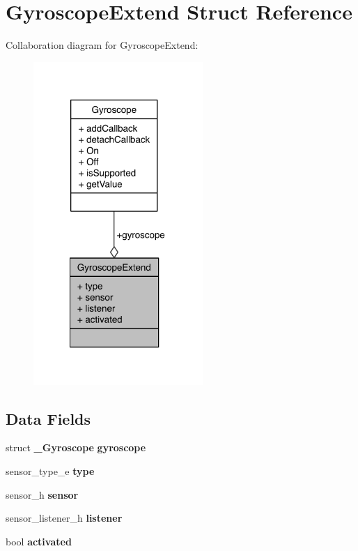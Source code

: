 \section{Gyroscope\-Extend Struct Reference}
\label{structGyroscopeExtend}


Collaboration diagram for Gyroscope\-Extend\-:\nopagebreak
\begin{figure}[H]
\begin{center}
\leavevmode
\includegraphics[width=182pt]{structGyroscopeExtend__coll__graph}
\end{center}
\end{figure}
\subsection*{Data Fields}
\begin{DoxyCompactItemize}
\item 
struct {\bf \-\_\-\-Gyroscope} {\bfseries gyroscope}\label{structGyroscopeExtend_a31add53e20f597df9a5ffc6e2c9c4b44}

\item 
sensor\-\_\-type\-\_\-e {\bfseries type}\label{structGyroscopeExtend_aa4086bb72f9600a7b3b43e90cd52076b}

\item 
sensor\-\_\-h {\bfseries sensor}\label{structGyroscopeExtend_a8c4247b5ce44a1aef6393f9ba0975b22}

\item 
sensor\-\_\-listener\-\_\-h {\bfseries listener}\label{structGyroscopeExtend_a1361f8e890d1ce164003739633ba0eb6}

\item 
bool {\bfseries activated}\label{structGyroscopeExtend_aecadafbf1e6d090ae7e7c31893cf2b25}

\end{DoxyCompactItemize}


